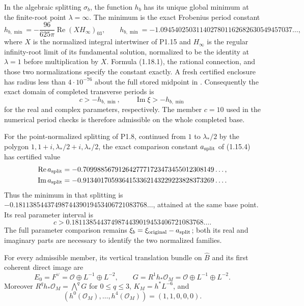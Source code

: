 \begin{theorem}\label{night:P1.18}
In the algebraic splitting $\sigma_b$, the function $h_b$ has its
unique global minimum at the finite-root point $\lambda=\infty$.
The minimum is the exact Frobenius period constant
\[
 h_{b,\min}=-\frac{96}{625\pi}\operatorname{Re}(XH_\infty)_{03},
 \qquad
 h_{b,\min}=-1.0945402503114027801162682630549457037\ldots,
\tag{1.18.1}
\]
where $X$ is the normalized integral intertwiner of P1.15 and
$H_\infty$ is the regular infinity-root limit of its fundamental
solution, normalized to be the identity at $\lambda=1$ before
multiplication by $X$.  Formula (1.18.1), the rational connection,
and those two normalizations specify the constant exactly.
A fresh certified enclosure has radius less than $4\cdot10^{-76}$
about the full stored midpoint in
.
Consequently the exact domain of completed transverse periods is
\[
 c>-h_{b,\min},\qquad
 \operatorname{Im}\xi>-h_{b,\min}
\]
for the real and complex parameters, respectively.
The member $c=10$ used in the numerical period checks is therefore
admissible on the whole completed base.

For the point-normalized splitting of P1.8, continued from
$1$ to $\lambda_*/2$ by the polygon
$1,1+i,\lambda_*/2+i,\lambda_*/2$, the exact comparison constant
$a_{\rm split}$ of (1.15.4) has certified value
\[
\begin{split}
 \operatorname{Re}a_{\rm split}
   &=-0.7099885679126427771723473455012308149\ldots,\\
 \operatorname{Im}a_{\rm split}
   &=-0.9134017059364153362143229223828373269\ldots.
\end{split}
\]
Thus the minimum in that splitting is
$-0.1811385443749874439019453406721083768\ldots$,
attained at the same base point.  Its real parameter interval is
\[
 c>0.1811385443749874439019453406721083768\ldots.
\]
The full parameter comparison remains
$\xi_b=\xi_{\rm original}-a_{\rm split}$; both its real and imaginary
parts are necessary to identify the two normalized families.
\end{theorem}

\begin{theorem}\label{night:P1A.1}
For every admissible member, its vertical translation bundle on
$\widehat B$ and its first coherent direct image are
\[
 E_0=F^\vee=\mathcal O\oplus L^{-1}\oplus L^{-2},\qquad
 G=R^1h_*\mathcal O_M=\mathcal O\oplus L^{-1}\oplus L^{-2}.
\]
Moreover $R^qh_*\mathcal O_M=\bigwedge^qG$ for $0\le q\le3$,
$K_M=h^*L^{-6}$, and
\[
 (h^0(\mathcal O_M),\ldots,h^4(\mathcal O_M))=(1,1,0,0,0).
\]
\end{theorem}

